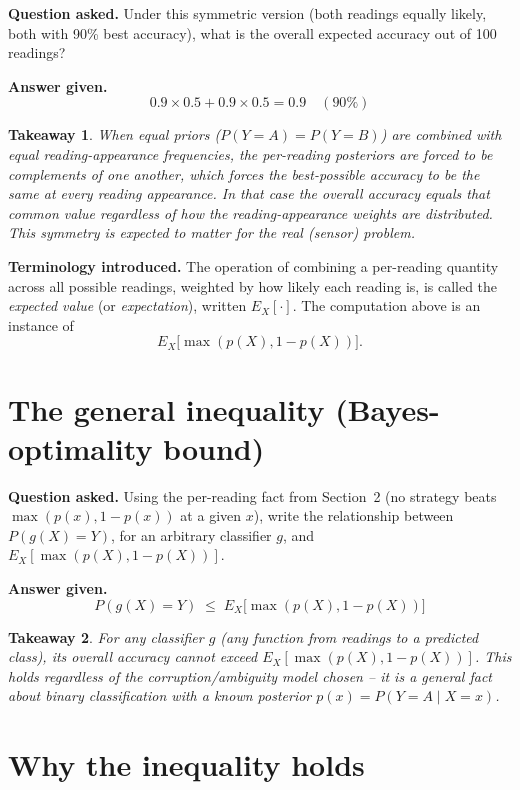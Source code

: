 \documentclass[11pt]{article}
\newtheorem*{takeaway}{Takeaway}
\begin{document}
\textbf{Question asked.} Under this symmetric version (both readings equally
likely, both with 90\% best accuracy), what is the overall expected
accuracy out of 100 readings?

\textbf{Answer given.}
\[
  0.9 \times 0.5 + 0.9 \times 0.5 = 0.9 \quad (90\%)
\]

\begin{takeaway}
When equal priors ($P(Y=A)=P(Y=B)$) are combined with equal
reading-appearance frequencies, the per-reading posteriors are forced to be
complements of one another, which forces the best-possible accuracy to be
\emph{the same} at every reading appearance. In that case the overall
accuracy equals that common value regardless of how the reading-appearance
weights are distributed. This symmetry is expected to matter for the real
(sensor) problem.
\end{takeaway}

\textbf{Terminology introduced.} The operation of combining a per-reading
quantity across all possible readings, weighted by how likely each reading
is, is called the \emph{expected value} (or \emph{expectation}), written
$E_X[\cdot]$. The computation above is an instance of
\[
  E_X\big[\max(p(X), 1-p(X))\big].
\]

\section{The general inequality (Bayes-optimality bound)}

\textbf{Question asked.} Using the per-reading fact from
Section~2 (no strategy beats $\max(p(x),1-p(x))$ at a given $x$), write the
relationship between $P(g(X)=Y)$, for an arbitrary classifier $g$, and
$E_X[\max(p(X), 1-p(X))]$.

\textbf{Answer given.}
\[
  P(g(X) = Y) \;\le\; E_X\big[\max(p(X), 1-p(X))\big]
\]

\begin{takeaway}
For \emph{any} classifier $g$ (any function from readings to a predicted
class), its overall accuracy cannot exceed
$E_X[\max(p(X), 1-p(X))]$. This holds regardless of the corruption/ambiguity
model chosen -- it is a general fact about binary classification with a
known posterior $p(x) = P(Y=A\mid X=x)$.
\end{takeaway}

\section{Why the inequality holds}
\end{document}
